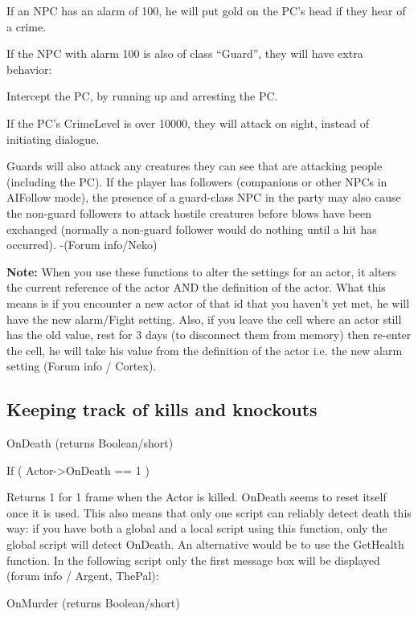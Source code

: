 If an NPC has an alarm of 100, he will put gold on the PC's head if they
hear of a crime.

If the NPC with alarm 100 is also of class ``Guard'', they will have
extra behavior:

Intercept the PC, by running up and arresting the PC.

If the PC's CrimeLevel is over 10000, they will attack on sight, instead
of initiating dialogue.

Guards will also attack any creatures they can see that are attacking
people (including the PC). If the player has followers (companions or
other NPCs in AIFollow mode), the presence of a guard-class NPC in the
party may also cause the non-guard followers to attack hostile creatures
before blows have been exchanged (normally a non-guard follower would do
nothing until a hit has occurred). -(Forum info/Neko)

\textbf{Note:} When you use these functions to alter the settings for an
actor, it alters the current reference of the actor AND the definition
of the actor. What this means is if you encounter a new actor of that id
that you haven't yet met, he will have the new alarm/Fight setting.
Also, if you leave the cell where an actor still has the old value, rest
for 3 days (to disconnect them from memory) then re-enter the cell, he
will take his value from the definition of the actor i.e. the new alarm
setting (Forum info / Cortex).

\hypertarget{keeping-track-of-kills-and-knockouts}{%
\subsection{Keeping track of kills and
knockouts}\label{keeping-track-of-kills-and-knockouts}}

OnDeath (returns Boolean/short)

If ( Actor-\textgreater OnDeath == 1 )

Returns 1 for 1 frame when the Actor is killed. OnDeath seems to reset
itself once it is used. This also means that only one script can
reliably detect death this way: if you have both a global and a local
script using this function, only the global script will detect OnDeath.
An alternative would be to use the GetHealth function. In the following
script only the first message box will be displayed (forum info /
Argent, ThePal):



OnMurder (returns Boolean/short)


